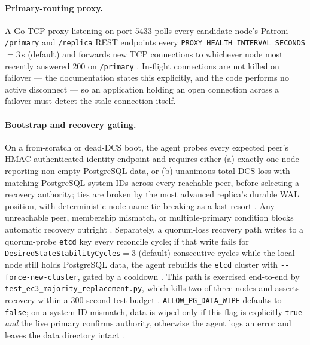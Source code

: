 \paragraph{Primary-routing proxy.} A Go TCP proxy listening on port 5433 polls every
candidate node's Patroni \texttt{/primary} and \texttt{/replica} REST endpoints every
\texttt{PROXY\_HEALTH\_INTERVAL\_SECONDS}$=3$\,s (default) and forwards new TCP
connections to whichever node most recently answered 200 on \texttt{/primary}
. In-flight connections are
not killed on failover --- the documentation states this explicitly, and the code
performs no active disconnect 
--- so an application holding an open connection across a failover must detect the stale
connection itself.

\paragraph{Bootstrap and recovery gating.} On a from-scratch or dead-DCS boot, the
agent probes every expected peer's HMAC-authenticated identity endpoint and requires
either (a) exactly one node reporting non-empty PostgreSQL data, or (b) unanimous
total-DCS-loss with matching PostgreSQL system IDs across every reachable peer, before
selecting a recovery authority; ties are broken by the most advanced replica's durable
WAL position, with deterministic node-name tie-breaking as a last resort
. Any
unreachable peer, membership mismatch, or multiple-primary condition blocks automatic
recovery outright 
. Separately,
a quorum-loss recovery path writes to a quorum-probe \texttt{etcd} key every reconcile
cycle; if that write fails for \texttt{Desired\allowbreak{}State\allowbreak{}Stability\allowbreak{}Cycles}$=3$ (default)
consecutive cycles while the local node still holds PostgreSQL data, the agent rebuilds
the \texttt{etcd} cluster with \texttt{-\allowbreak{}-\allowbreak{}force-\allowbreak{}new-\allowbreak{}cluster}, gated by a cooldown
. This path is
exercised end-to-end by \texttt{test\_ec3\_majority\_replacement.\allowbreak{}py}, which kills two of
three nodes and asserts recovery within a 300-second test budget
.
\texttt{ALLOW\_PG\_DATA\_WIPE} defaults to \texttt{false}; on a system-ID mismatch, data
is wiped only if this flag is explicitly \texttt{true} \emph{and} the live primary
confirms authority, otherwise the agent logs an error and leaves the data directory
intact .

